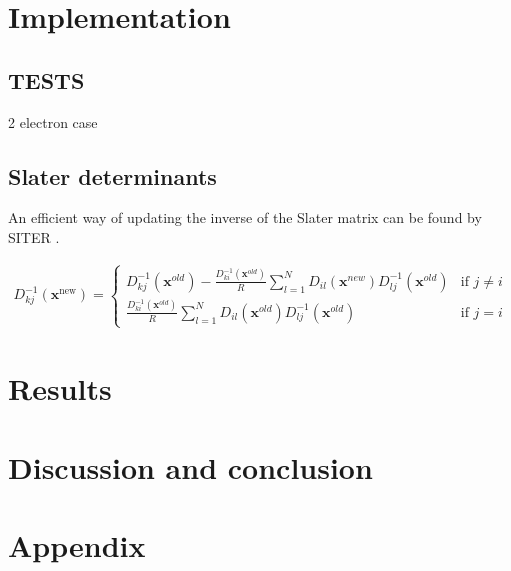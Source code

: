 \documentclass[11pt]{article}
\newcommand{\husk}[1]{\color{red} #1 \color{black}}
\begin{document}
\section{Implementation}


\subsection{TESTS}
\husk{2 electron case}

\subsection{Slater determinants}
An efficient way of updating the inverse of the Slater matrix can be found by \husk{SITER}. 

\begin{align}
D_{kj}^{-1}(\mathbf{x}^\text{new}) = \left\{
\begin{array}{ll}
	D_{kj}^{-1}(\mathbf{x}^{old}) - \frac{D_{ki}^{-1}(\mathbf{x}^{old})}{R}\sum^N_{l=1} D_{il}(\mathbf{x}^{new})D^{-1}_{lj}(\mathbf{x}^{old}) & \text{if } j\neq i \\
	\frac{D_{ki}^{-1}(\mathbf{x}^{old})}{R}\sum^N_{l=1} D_{il}(\mathbf{x}^{old})D^{-1}_{lj}(\mathbf{x}^{old}) & \text{if } j = i
\end{array}
\right.
\end{align}


\section{Results}



\section{Discussion and conclusion}



\section{Appendix}
\end{document}
